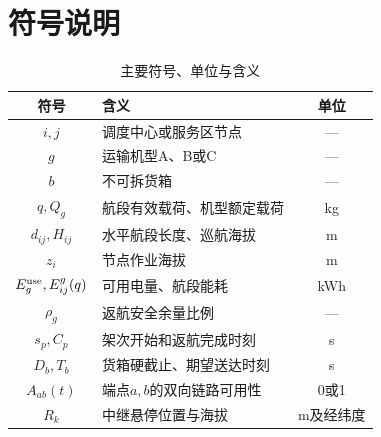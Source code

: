\section{符号说明}

\begin{table}[H]\centering\small
\caption{主要符号、单位与含义}\label{tab:symbols}
\begin{tabular}{clc}\toprule
符号 & 含义 & 单位\\\midrule
$i,j$ & 调度中心或服务区节点 & ---\\
$g$ & 运输机型A、B或C & ---\\
$b$ & 不可拆货箱 & ---\\
$q,Q_g$ & 航段有效载荷、机型额定载荷 & kg\\
$d_{ij},H_{ij}$ & 水平航段长度、巡航海拔 & m\\
$z_i$ & 节点作业海拔 & m\\
$E_g^{\rm use},E_{ij}^g(q)$ & 可用电量、航段能耗 & kWh\\
$\rho_g$ & 返航安全余量比例 & ---\\
$s_p,C_p$ & 架次开始和返航完成时刻 & s\\
$D_b,T_b$ & 货箱硬截止、期望送达时刻 & s\\
$A_{ab}(t)$ & 端点$a,b$的双向链路可用性 & 0或1\\
$R_k$ & 中继悬停位置与海拔 & m及经纬度\\
\bottomrule\end{tabular}
\end{table}

